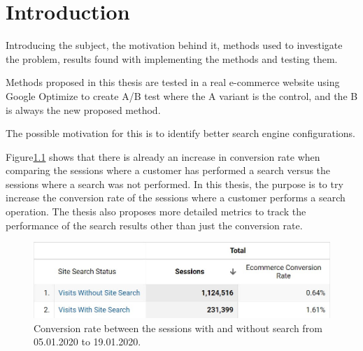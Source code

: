 


\chapter{Introduction}
\label{ch:intro} 

\setcounter{page}{1} %

Introducing the subject, the motivation behind it, methods used to investigate the problem, results found with implementing the methods and testing them.

Methods proposed in this thesis are tested in a real e-commerce website using Google Optimize to create A/B test where the A variant is the control, and the B is always the new proposed method. 

 The possible motivation for this is to identify better search engine configurations. 

Figure\ref{fig:base_conv_compare} shows that there is already an increase in conversion rate when comparing the sessions where a customer has performed a search versus the sessions where a search was not performed. 
In this thesis, the purpose is to try increase the conversion rate of the sessions where a customer performs a search operation. 
The thesis also proposes more detailed metrics to track the performance of the search results other than just the conversion rate.

\begin{figure}[h]
    \centering
    \includegraphics[width=1.0\textwidth]{img/ecom-conv-search-vs-nosearch-05_01-19_01.jpg}
    \caption{Conversion rate between the sessions with and without search from 05.01.2020 to 19.01.2020.}
    \label{fig:base_conv_compare}
\end{figure}



